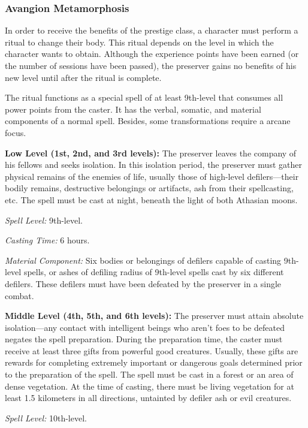 {\subsubsection{Avangion Metamorphosis}
\label{Avangion Metamorphosis}

In order to receive the benefits of the prestige class, a character must perform a ritual to change their body. This ritual depends on the level in which the character wants to obtain. Although the experience points have been earned (or the number of sessions have been passed), the preserver gains no benefits of his new level until after the ritual is complete.

The ritual functions as a special spell of at least 9th-level that consumes all power points from the caster. It has the verbal, somatic, and material components of a normal spell. Besides, some transformations require a arcane focus.

\textbf{Low Level (1st, 2nd, and 3rd levels):} The preserver leaves the company of his fellows and seeks isolation. In this isolation period, the preserver must gather physical remains of the enemies of life, usually those of high-level defilers---their bodily remains, destructive belongings or artifacts, ash from their spellcasting, etc. The spell must be cast at night, beneath the light of both Athasian moons.

\textit{Spell Level:} 9th-level.

\textit{Casting Time:} 6 hours.

\textit{Material Component:} Six bodies or belongings of defilers capable of casting 9th-level spells, or ashes of defiling radius of 9th-level spells cast by six different defilers. These defilers must have been defeated by the preserver in a single combat.

\textbf{Middle Level (4th, 5th, and 6th levels):} The preserver must attain absolute isolation---any contact with intelligent beings who aren't foes to be defeated negates the spell preparation. During the preparation time, the caster must receive at least three gifts from powerful good creatures. Usually, these gifts are rewards for completing extremely important or dangerous goals determined prior to the preparation of the spell. The spell must be cast in a forest or an area of dense vegetation. At the time of casting, there must be living vegetation for at least 1.5 kilometers in all directions, untainted by defiler ash or evil creatures.

\textit{Spell Level:} 10th-level.

}
